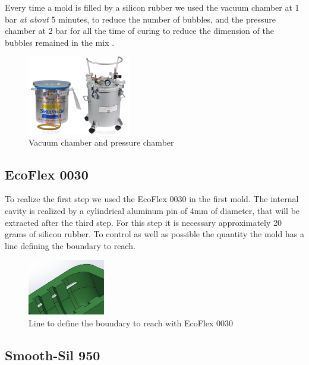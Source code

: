 \documentclass{article}
\begin{document}
Every time a mold is filled by a silicon rubber we used the vacuum chamber at 1 bar \emph{at about} 5 minutes, to reduce the number of bubbles, and the pressure chamber at 2 bar for all the time of curing to reduce the dimension of the bubbles remained in the mix .

\begin{figure}[h]
    \centering
    \includegraphics[width=0.4\textwidth]{Pictures/fingerOnToroidal/VacuumPressureChambers.png}
    \caption{Vacuum chamber and pressure chamber}
    \label{fig:vacuumPressureChamber}
\end{figure}



\subsection{EcoFlex 0030}

To realize the first step we used the EcoFlex 0030 in the first mold. The internal cavity is realized by a cylindrical aluminum pin of 4mm of diameter, that will be extracted after the third step.
For this step it is necessary approximately 20 grams of silicon rubber. 
To control as well as possible the quantity the mold has a line defining the boundary to reach.

\begin{figure}[h]
	\centering
	\includegraphics[width=0.3\textwidth]{Pictures/fingerOnToroidal/LineMoldFirstStep.JPG}
	\caption{Line to define the boundary to reach with EcoFlex 0030}
	\label{fig:ecoFlexLine}
\end{figure}


\subsection{Smooth-Sil 950}
\end{document}
